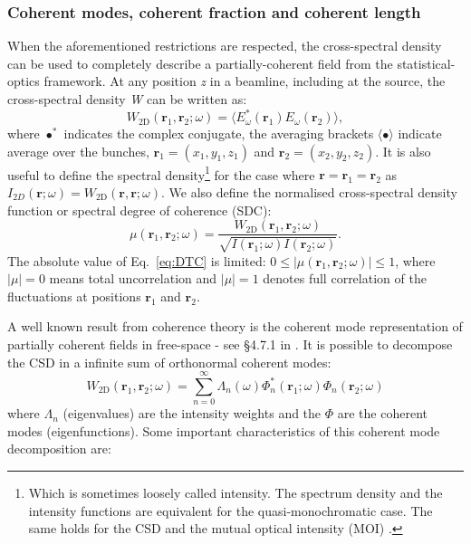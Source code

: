 \documentclass{iucr}              %
\begin{document}
\subsubsection{Coherent modes, coherent fraction and coherent length}

When the aforementioned restrictions are respected, the cross-spectral density can be used to completely describe a partially-coherent field from the statistical-optics framework. At any position \textit{z} in a beamline, including at the source, the cross-spectral density \textit{W} can be written as:
\begin{equation}
W_\text{2D}(\textbf{r}_1,\textbf{r}_2;\omega) = \big\langle E^*_{\omega}(\textbf{r}_1)  E_{\omega}(\textbf{r}_2)\big\rangle,
\label{eq:CSD_2D}
\end{equation}
where $\bullet^*$ indicates the complex conjugate, the averaging brackets $\langle \bullet \rangle$ indicate average over the bunches, $\textbf{r}_1=(x_1,y_1,z_1)$ and $\textbf{r}_2=(x_2,y_2,z_2)$. It is also useful to define the spectral density\footnote{Which is sometimes loosely called intensity. The spectrum density and the intensity functions are equivalent for the quasi-monochromatic case. The same holds for the CSD and the mutual optical intensity (MOI) \cite{mandel_wolf}.} for the case where $\textbf{r}=\textbf{r}_1=\textbf{r}_2$ as $I_{2D}(\textbf{r};\omega)=W_\text{2D}(\textbf{r},\textbf{r};\omega)$. We also define the normalised cross-spectral density function or spectral degree of coherence (SDC):
\begin{equation}
\mu(\textbf{r}_1,\textbf{r}_2;\omega) = \frac{W_\text{2D}(\textbf{r}_1,\textbf{r}_2;\omega)}{\sqrt{I(\textbf{r}_1;\omega) I(\textbf{r}_2;\omega)}}.
\label{eq:DTC}
\end{equation}
The absolute value of Eq.~\ref{eq:DTC} is limited: $0\leq|\mu(\textbf{r}_1,\textbf{r}_2;\omega)|\leq 1$, where $|\mu|=0$ means total uncorrelation and $|\mu|=1$ denotes full correlation of the fluctuations at positions $\textbf{r}_1$ and $\textbf{r}_2$.

A well known result from coherence theory is the coherent mode representation of partially coherent fields in free-space - see §4.7.1 in \cite{mandel_wolf}. It is possible to decompose the CSD in a infinite sum of orthonormal coherent modes:
\begin{equation}\label{eq:W2DCMD}
W_\text{2D}(\textbf{r}_1,\textbf{r}_2;\omega) = \sum_{n=0}^{\infty} \Lambda_n(\omega) \Phi_{n}^*(\textbf{r}_1;\omega) \Phi_{n}(\textbf{r}_2;\omega)
\end{equation}
where $\Lambda_n$ (eigenvalues) are the intensity weights and the $\Phi$ are the coherent modes (eigenfunctions). 
Some important characteristics of this coherent mode decomposition are: 
\end{document}
